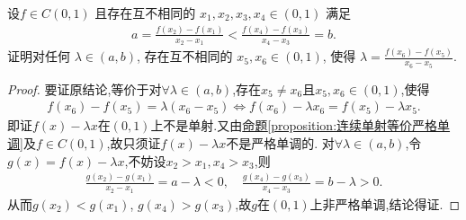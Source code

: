\documentclass[../../main.tex]{subfiles}%
\begin{document}
\begin{example}
设$f \in C(0,1)$ 且存在互不相同的 $x_1, x_2, x_3, x_4 \in (0,1)$ 满足
\begin{align*}
a = \frac{f(x_2) - f(x_1)}{x_2 - x_1} < \frac{f(x_4) - f(x_3)}{x_4 - x_3} = b.
\end{align*}
证明对任何 $\lambda \in (a, b)$, 存在互不相同的 $x_5, x_6 \in (0,1)$, 使得 $\lambda = \frac{f(x_6) - f(x_5)}{x_6 - x_5}$.
\end{example}
\begin{proof}

要证原结论,等价于对$\forall \lambda \in (a,b)$,存在$x_5 \ne x_6$且$x_5,x_6 \in (0,1)$,使得
\begin{align*}
f(x_6) -f(x_5) = \lambda (x_6-x_5) \iff f(x_6) -\lambda x_6=f(x_5) -\lambda x_5.
\end{align*}
即证$f(x) -\lambda x$在$(0,1)$上不是单射.又由\hyperref[proposition:连续单射等价严格单调]{命题\ref{proposition:连续单射等价严格单调}}及$f\in C(0,1)$,故只须证$f(x) -\lambda x$不是严格单调的.
对$\forall \lambda \in (a,b)$,令$g(x) =f(x) -\lambda x$,不妨设$x_2>x_1,x_4>x_3$,则  
\begin{align*}
\frac{g(x_2) -g(x_1)}{x_2-x_1}=a-\lambda <0,\quad \frac{g(x_4) -g(x_3)}{x_4-x_3}=b-\lambda >0.
\end{align*}
从而$g(x_2) <g(x_1)$, $g(x_4) >g(x_3)$,故$g$在$(0,1)$上非严格单调,结论得证.

\end{proof}
\end{document}
